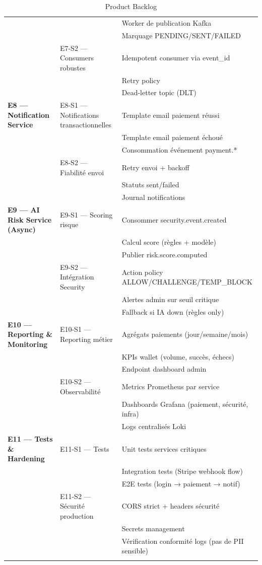 \documentclass[12pt,a4paper]{report}
\begin{document}
\begin{longtable}{|p{3.5cm}|p{3.5cm}|p{9cm}|}
& & Worker de publication Kafka \\
& & Marquage PENDING/SENT/FAILED \\
& E7-S2 — Consumers robustes & Idempotent consumer via event\_id \\
& & Retry policy \\
& & Dead-letter topic (DLT) \\
\hline
\textbf{E8 — Notification Service} & E8-S1 — Notifications transactionnelles & Template email paiement réussi \\
& & Template email paiement échoué \\
& & Consommation événement payment.* \\
& E8-S2 — Fiabilité envoi & Retry envoi + backoff \\
& & Statuts sent/failed \\
& & Journal notifications \\
\hline
\textbf{E9 — AI Risk Service (Async)} & E9-S1 — Scoring risque & Consommer security.event.created \\
& & Calcul score (règles + modèle) \\
& & Publier risk.score.computed \\
& E9-S2 — Intégration Security & Action policy ALLOW/CHALLENGE/TEMP\_BLOCK \\
& & Alertes admin sur seuil critique \\
& & Fallback si IA down (règles only) \\
\hline
\textbf{E10 — Reporting \& Monitoring} & E10-S1 — Reporting métier & Agrégats paiements (jour/semaine/mois) \\
& & KPIs wallet (volume, succès, échecs) \\
& & Endpoint dashboard admin \\
& E10-S2 — Observabilité & Metrics Prometheus par service \\
& & Dashboards Grafana (paiement, sécurité, infra) \\
& & Logs centralisés Loki \\
\hline
\textbf{E11 — Tests \& Hardening} & E11-S1 — Tests & Unit tests services critiques \\
& & Integration tests (Stripe webhook flow) \\
& & E2E tests (login → paiement → notif) \\
& E11-S2 — Sécurité production & CORS strict + headers sécurité \\
& & Secrets management \\
& & Vérification conformité logs (pas de PII sensible) \\
\hline
\caption{Product Backlog}
\end{longtable}
\end{document}
